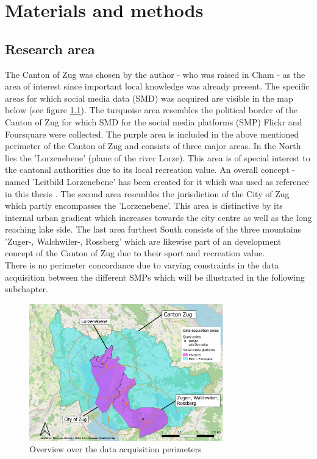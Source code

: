 \chapter{Materials and methods} \label{material_methods}

\section{Research area} \label{research_area}
The Canton of Zug was chosen by the author - who was raised in Cham - as the area of interest since important local knowledge was already present. The specific areas for which social media data (SMD) was acquired are visible in the map below (see figure \ref{fig:research_area}). The turquoise area resembles the political border of the Canton of Zug for which SMD for the social media platforms (SMP) Flickr and Foursquare were collected. The purple area is included in the above mentioned perimeter of the Canton of Zug and consists of three major areas. In the North lies the 'Lorzenebene' (plane of the river Lorze). This area is of special interest to the cantonal authorities due to its local recreation value. An overall concept - named 'Leitbild Lorzenebene' has been created for it which was used as reference in this thesis \parencite{BaudirektiondesKantonsZug2012}. The second area resembles the jurisdiction of the City of Zug which partly encompasses the 'Lorzenebene'. This area is distinctive by its internal urban gradient which increases towards the city centre as well as the long reaching lake side. The last area furthest South consists of the three mountains 'Zuger-, Walchwiler-, Rossberg' which are likewise part of an development concept \parencite{Berchtold2011} of the Canton of Zug due to their sport and recreation value. \\
There is no perimeter concordance due to varying constraints in the data acquisition between the different SMPs which will be illustrated in the following subchapter.

\begin{figure}[h]
   \centering
   \includegraphics[width=0.75\textwidth]{img/overview_research_area_w_Lorzenebene}
   \caption{Overview over the data acquisition perimeters}
   \label{fig:research_area}
\end{figure}



